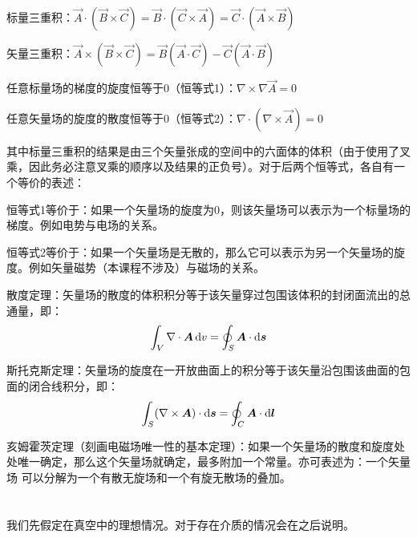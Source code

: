 \begin{law}[矢量等式]
    标量三重积：$\vec{A}\cdot (\vec{B}\times \vec{C}) = \vec{B}\cdot (\vec{C}\times \vec{A}) = \vec{C}\cdot (\vec{A}\times \vec{B})$

    矢量三重积：$\vec{A}\times (\vec{B}\times \vec{C}) = \vec{B} (\vec{A}\cdot \vec{C}) - \vec{C}  (\vec{A}\cdot \vec{B})$

    任意标量场的梯度的旋度恒等于0（恒等式1）：$\nabla \times \nabla\vec{A} = 0$

    任意矢量场的旋度的散度恒等于0（恒等式2）：$\nabla \cdot (\nabla \times \vec{A}) = 0$
\end{law}

其中标量三重积的结果是由三个矢量张成的空间中的六面体的体积（由于使用了叉乘，因此务必注意叉乘的顺序以及结果的正负号）。对于后两个恒等式，各自有一个等价的表述：

恒等式1等价于：如果一个矢量场的旋度为0，则该矢量场可以表示为一个标量场的梯度。例如电势与电场的关系。

恒等式2等价于：如果一个矢量场是无散的，那么它可以表示为另一个矢量场的旋度。例如矢量磁势（本课程不涉及）与磁场的关系。

\begin{law}[相关定理]
    \begin{Itemize}
        \item 散度定理：矢量场的散度的体积积分等于该矢量穿过包围该体积的封闭面流出的总通量，即：
            \[\int_V \nabla\cdot \vec{A}\dif v = \oint_S \vec{A}\cdot \dif \vec{s}\]

        \item 斯托克斯定理：矢量场的旋度在一开放曲面上的积分等于该矢量沿包围该曲面的包面的闭合线积分，即：
            \[\int_S (\nabla\times \vec{A})\cdot \dif \vec{s} = \oint_C \vec{A}\cdot \dif \vec{l}\]

        \item 亥姆霍茨定理（刻画电磁场唯一性的基本定理）：如果一个矢量场的散度和旋度处处唯一确定，那么这个矢量场就确定，最多附加一个常量。亦可表述为：一个矢量场
            可以分解为一个有散无旋场和一个有旋无散场的叠加。
    \end{Itemize}
\end{law}
\section[高斯定理]{}
我们先假定在真空中的理想情况。对于存在介质的情况会在之后说明。

